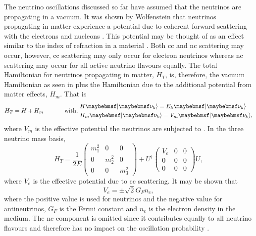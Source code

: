 The neutrino oscillations discussed so far have assumed that the neutrinos are propagating in a vacuum. It was shown by Wolfenstein that neutrinos propagating in matter experience a potential due to coherent forward scattering with the electrons and nucleons \cite{Wolfenstein}. This potential may be thought of as an effect similar to the index of refraction in a material \cite{Fundamentals_of_Neutrino_Physics_and_Astrophysics}. Both \gls{cc} and \gls{nc} scattering may occur, however, \gls{cc} scattering may only occur for electron neutrinos whereas \gls{nc} scattering may occur for all active neutrino flavours equally. The total Hamiltonian for neutrinos propagating in matter, $H_T$, is, therefore, the vacuum Hamiltonian as seen in  plus the Hamiltonian due to the additional potential from matter effects, $H_m$. That is 
\begin{equation}
    H_T = H + H_m \text{ \hspace{1cm} with, } \begin{split}
        & H\ket{\nu_k} = E_k\ket{\nu_k} \\
        & H_m\ket{\nu_k} = V_m\ket{\nu_k},
    \end{split}
\end{equation} 
where $V_m$ is the effective potential the neutrinos are subjected to \cite{Fundamentals_of_Neutrino_Physics_and_Astrophysics}. In the three neutrino mass basis,
\begin{equation}
H_T = \frac{1}{2E} 
\begin{pmatrix}
m_1^2 & 0 & 0 \\
0 & m_2^2 & 0 \\
0 & 0 & m_3^2
\end{pmatrix}
+ U^\dag
\begin{pmatrix}
V_e & 0 & 0 \\
0 & 0 & 0 \\
0 & 0 & 0
\end{pmatrix}
U,
\end{equation}
where $V_e$ is the effective potential due to \gls{cc} scattering. It may be shown that 
\begin{equation}
    V_e = \pm \sqrt{2}G_Fn_e,
\end{equation}
where the positive value is used for neutrinos and the negative value for antineutrinos, $G_F$ is the Fermi constant and $n_e$ is the electron density in the medium.
The \gls{nc} component is omitted since it contributes equally to all neutrino flavours and therefore has no impact on the oscillation probability \cite{PDG_2022}. 

